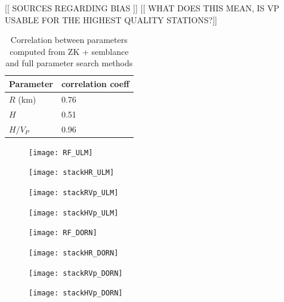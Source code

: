 \documentclass[draft, 12pt]{article}
\begin{document}
[[ SOURCES REGARDING BIAS ]] [[ WHAT DOES THIS MEAN, IS VP USABLE FOR THE HIGHEST QUALITY STATIONS?]]


\begin{table}
  \begin{tabular}{ l l }
    \hline
    Parameter & correlation coeff \\
    \hline
    $R$ (km) &  0.76 \\
    $H$      &  0.51 \\
    $H/V_P$  &  0.96 \\
    \hline
  \end{tabular}
  \caption{Correlation between parameters computed from ZK + semblance and full parameter search methods}
\label{table:ZKvsFG}

\end{table}


\begin{figure}
  \centering
  \texttt{[image: RF\_ULM]}
  \caption{}
  \label{fig:RF_ULM}
\end{figure}

\begin{figure}
  \centering
  \texttt{[image: stackHR\_ULM]}
  \caption{}
  \label{fig:HR_ULM}
\end{figure}

\begin{figure}
  \centering
  \texttt{[image: stackRVp\_ULM]}
  \caption{}
  \label{fig:RVp_ULM}
\end{figure}

\begin{figure}
  \centering
  \texttt{[image: stackHVp\_ULM]}
  \caption{}
  \label{fig:HVp_ULM}
\end{figure}

\begin{figure}
  \centering
  \texttt{[image: RF\_DORN]}
  \caption{}
  \label{fig:RF_DORN}
\end{figure}


\begin{figure}
  \centering
  \texttt{[image: stackHR\_DORN]}
  \caption{}
  \label{fig:HR_DORN}
\end{figure}

\begin{figure}
  \centering
  \texttt{[image: stackRVp\_DORN]}
  \caption{}
  \label{fig:RVp_DORN}
\end{figure}

\begin{figure}
  \centering
  \texttt{[image: stackHVp\_DORN]}
  \caption{}
  \label{fig:HVp_DORN}
\end{figure}
\end{document}
